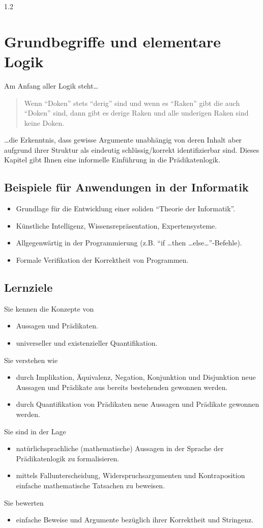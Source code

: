 1.2\chapter{Grundbegriffe und elementare Logik}


Am Anfang aller Logik steht\dots
\begin{quote}
Wenn ``Doken'' stets ``derig'' sind und wenn es ``Raken'' gibt die auch ``Doken'' sind, dann gibt es
derige Raken und alle underigen Raken sind keine Doken.
\end{quote}
 \dots die Erkenntnis, dass
gewisse Argumente unabhängig von deren Inhalt aber aufgrund ihrer Struktur als eindeutig
schlüssig/korrekt identifizierbar sind. Dieses Kapitel gibt Ihnen eine informelle Einführung in die Prädikatenlogik.

\section*{Beispiele für Anwendungen in der Informatik}
\begin{itemize}
\item Grundlage für die Entwicklung einer soliden ``Theorie der Informatik''.
\item Künstliche Intelligenz, Wissensrepräsentation, Expertensysteme.
\item Allgegenwärtig in der Programmierung (z.B. ``if \dots then \dots else\dots''-Befehle).
\item Formale Verifikation der Korrektheit von Programmen.
\end{itemize}



\section*{Lernziele}
Sie kennen die Konzepte von
\begin{itemize}
\item Aussagen und Prädikaten.
\item universeller und existenzieller Quantifikation.
\end{itemize}
Sie verstehen wie
\begin{itemize}
\item durch Implikation, Äquivalenz, Negation, Konjunktion und Disjunktion neue Aussagen und Prädikate aus bereits bestehenden gewonnen werden.
\item durch Quantifikation von Prädikaten neue Aussagen und Prädikate gewonnen werden.
\end{itemize}
Sie sind in der Lage
\begin{itemize}
\item natürlichsprachliche (mathematische) Aussagen in der Sprache der Prädikatenlogik zu formalisieren.
\item mittels Fallunterscheidung, Widerspruchsargumenten und Kontraposition einfache mathematische Tatsachen zu beweisen.
\end{itemize}
Sie bewerten
\begin{itemize}
\item einfache Beweise und Argumente bezüglich ihrer Korrektheit und Stringenz.
\end{itemize}

